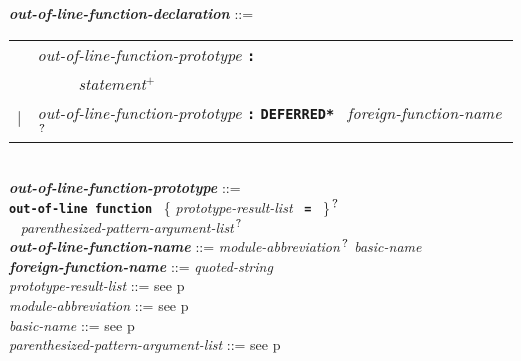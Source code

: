 \documentclass[12pt]{article}
\newcommand{\TT}[1]{{\tt \bfseries #1}}
\newcommand{\PLUS}[1][]{{$^{+#1}$}}
\newcommand{\QMARK}{{$^{\,\mbox{\footnotesize ?}}$}}
\newcommand{\ttkey}[1]{{\tt \bfseries #1}}
\newcommand{\emkey}[1]{{\em \bfseries #1}}
\newcommand{\pagref}[1]{p\pageref{#1}}
\newenvironment{indpar}[1][0.3in]%
	{\begin{list}{}%
		     {\setlength{\itemsep}{0in}%
		      \setlength{\topsep}{0in}%
		      \setlength{\parsep}{1ex}%
		      \setlength{\labelwidth}{#1}%
		      \setlength{\leftmargin}{#1}%
		      \addtolength{\leftmargin}{\labelsep}}%
	 \item}%
	{\end{list}}
\begin{document}
\begin{indpar}
\emkey{out-of-line-function-declaration}%
	\label{OUT-OF-LINE-FUNCTION-DECLARATION} ::= \\
\hspace*{0.5in}
    \begin{tabular}[t]{rl}
        &  {\em out-of-line-function-prototype} \TT{:} \\
	& \TT{~~~~~}{\em statement}\PLUS{} \\
    $|$ &  {\em out-of-line-function-prototype} \TT{:}
    		\ttkey{*DEFERRED*}~ {\em foreign-function-name}\QMARK{} \\
    \end{tabular}
\\[2ex]
\emkey{out-of-line-function-prototype}%
	\label{OUT-OF-LINE-FUNCTION-PROTOTYPE} ::= \\
\hspace*{0.25in} \ttkey{out-of-line function}~
          \{ {\em prototype-result-list}~ \TT{=}~ \}\QMARK{} \\
\hspace*{0.5in}{\em out-of-line-function-name}~
	      {\em parenthesized-pattern-argument-list}\QMARK{}
\\[0.5ex]
\emkey{out-of-line-function-name} ::=
    {\em module-abbreviation}\QMARK{} {\em basic-name}
\\[0.5ex]
\emkey{foreign-function-name}\label{FOREIGN-FUNCTION-NAME}
	::= {\em quoted-string}
\\[0.5ex]
{\em prototype-result-list} ::= see \pagref{PROTOTYPE-RESULT-LIST}
\\[0.5ex]
{\em module-abbreviation} ::= see \pagref{MODULE-ABBREVIATION}
\\[0.5ex]
{\em basic-name} ::= see \pagref{BASIC-NAME}
\\[0.5ex]
{\em parenthesized-pattern-argument-list} ::=
    see \pagref{PARENTHESIZED-PATTERN-ARGUMENT-LIST}


\end{indpar}
\end{document}
